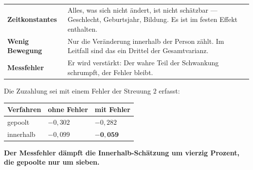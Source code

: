 \begin{warnung}
\begin{center}
{\small
\renewcommand{\arraystretch}{1.52}
\begin{tabular}{@{}P{2.8cm}P{5.8cm}@{}}
\toprule
\textbf{Zeitkonstantes} & Alles, was sich nicht ändert, ist nicht schätzbar --- Geschlecht, Geburtsjahr, Bildung. Es ist im festen Effekt enthalten.\\
\textbf{Wenig Bewegung} & Nur die Veränderung innerhalb der Person zählt. Im Leitfall sind das ein Drittel der Gesamtvarianz.\\
\textbf{Messfehler} & Er wird verstärkt: Der wahre Teil der Schwankung schrumpft, der Fehler bleibt.\\
\bottomrule
\end{tabular}}
\end{center}

Die Zuzahlung sei mit einem Fehler der Streuung $2$ erfasst:

\begin{center}
{\small
\renewcommand{\arraystretch}{1.48}
\begin{tabular}{@{}P{2.6cm}P{2.2cm}P{2.6cm}@{}}
\toprule
\textbf{Verfahren} & \textbf{ohne Fehler} & \textbf{mit Fehler}\\
\midrule
gepoolt & $-0{,}302$ & $-0{,}282$\\
innerhalb & $-0{,}099$ & $\mathbf{-0{,}059}$\\
\bottomrule
\end{tabular}}
\end{center}

\begin{center}
\begin{minipage}{0.9\textwidth}
\textbf{Der Messfehler dämpft die Innerhalb-Schätzung um vierzig Prozent, die gepoolte nur um sieben.}
\end{minipage}
\end{center}

\begin{center}
\begin{minipage}{0.88\textwidth}
\end{minipage}
\end{center}
\end{warnung}

